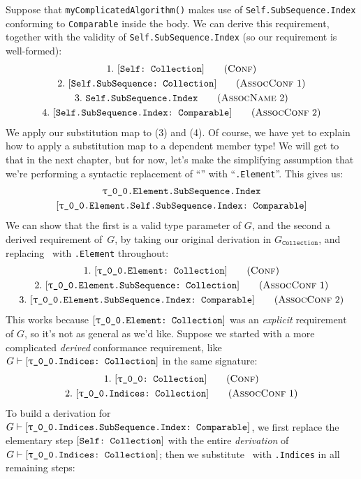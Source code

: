 \documentclass[../generics]{subfiles}
\begin{document}
Suppose that \texttt{myComplicatedAlgorithm()} makes use of \texttt{Self.SubSequence.Index} conforming to \texttt{Comparable} inside the body. We can derive this requirement, together with the validity of \texttt{Self.SubSequence.Index} (so our requirement is well-formed):
\begin{gather*}
\ConfStep{Self}{Collection}{1}\\
\AssocConfStep{1}{Self.SubSequence}{Collection}{2}\\
\AssocNameStep{2}{Self.SubSequence.Index}{3}\\
\AssocConfStep{2}{Self.SubSequence.Index}{Comparable}{4}
\end{gather*}
We apply our substitution map to (3) and (4). Of course, we have yet to explain how to apply a substitution map to a dependent member type! We will get to that in the next chapter, but for now, let's make the simplifying assumption that we're performing a syntactic replacement of ``\tSelf'' with ``\texttt{\rT.Element}''. This gives us:
\begin{gather*}
\texttt{\rT.Element.SubSequence.Index}\\
\ConfReq{\rT.Element.Self.SubSequence.Index}{Comparable}
\end{gather*}
We can show that the first is a valid type parameter of $G$, and the second a derived requirement of~$G$, by taking our original derivation in $G_\texttt{Collection}$, and replacing \tSelf\ with \texttt{\rT.Element} throughout:
\begin{gather*}
\ConfStep{\rT.Element}{Collection}{1}\\
\AssocConfStep{1}{\rT.Element.SubSequence}{Collection}{2}\\
\AssocConfStep{2}{\rT.Element.SubSequence.Index}{Comparable}{3}
\end{gather*}
This works because $\ConfReq{\rT.Element}{Collection}$ was an \emph{explicit} requirement of $G$, so it's not as general as we'd like. Suppose we started with a more complicated \emph{derived} conformance requirement, like $G\vdash\ConfReq{\rT.Indices}{Collection}$ in the same signature:
\begin{gather*}
\ConfStep{\rT}{Collection}{1}\\
\AssocConfStep{1}{\rT.Indices}{Collection}{2}
\end{gather*}
To build a derivation for $G\vdash\ConfReq{\rT.Indices.SubSequence.Index}{Comparable}$, we first replace the elementary step $[\texttt{Self:~Collection}]$ with the entire \emph{derivation} of $G\vdash\ConfReq{\rT.Indices}{Collection}$; then we substitute \tSelf\ with \texttt{\rT.Indices} in all remaining steps:
\end{document}

